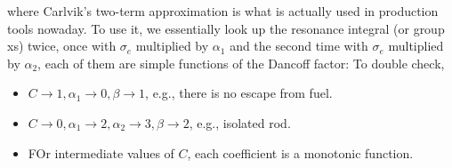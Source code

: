 \documentclass{school-22.211-notes}
\begin{document}
\clearpage
{}
where
Carlvik's two-term approximation is what is actually used in production tools nowaday. To use it, we essentially look up the resonance integral (or group xs) twice, once with $\sigma_e$ multiplied by $\alpha_1$ and the second time with $\sigma_e$ multiplied by $\alpha_2$, each of them are simple functions of the Dancoff factor: 
To double check, 
\begin{itemize}
\item $C\to 1, \alpha_1 \to 0, \beta \to 1$, e.g., there is no escape from fuel.
\item $C\to 0, \alpha_1 \to 2, \alpha_2 \to 3, \beta \to 2$, e.g., isolated rod.
\item FOr intermediate values of $C$, each coefficient is a monotonic function.
\end{itemize}
\end{document}

